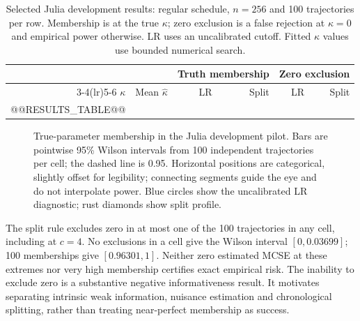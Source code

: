 \documentclass[11pt]{article}
\newcommand{\membershipplot}[1]{%
\addplot+[color=baseline,mark=*,mark size=1.5pt,error bars/.cd,y dir=both,y explicit]
 table[x expr=\thisrow{index}-0.06,y=lr,y error minus=lrminus,y error plus=lrplus]{#1};
\addplot+[color=splitcolor,mark=diamond*,mark size=1.8pt,error bars/.cd,y dir=both,y explicit]
 table[x expr=\thisrow{index}+0.06,y=split,y error minus=splitminus,y error plus=splitplus]{#1};
\addplot[gray,dashed,forget plot] coordinates {(0.65,0.95) (4.35,0.95)};
}
\begin{document}
\begin{table}[!htbp]
\centering\small
\caption{Selected Julia development results: regular schedule, $n=256$ and
100 trajectories per row. Membership is at the true $\kappa$; zero exclusion
is a false rejection at $\kappa=0$ and empirical power otherwise. LR uses an
uncalibrated cutoff. Fitted $\kappa$ values use bounded numerical search.}
\label{tab:results}
\begin{tabular}{rrrrrr}
\toprule
 & & \multicolumn{2}{c}{Truth membership} & \multicolumn{2}{c}{Zero exclusion}\\
\cmidrule(lr){3-4}\cmidrule(lr){5-6}
$\kappa$ & Mean $\widehat\kappa$ & LR & Split & LR & Split\\
\midrule
@@RESULTS_TABLE@@
\bottomrule
\end{tabular}
\end{table}

\begin{figure}[!ht]
\centering
{}
\caption{True-parameter membership in the Julia development pilot. Bars are
pointwise 95\% Wilson intervals from 100 independent trajectories per cell;
the dashed line is 0.95. Horizontal positions are categorical, slightly offset
for legibility; connecting segments guide the eye and do not interpolate power.
Blue circles show the uncalibrated LR diagnostic; rust diamonds show split profile.}
\label{fig:membership}
\end{figure}

The split rule excludes zero in at most one of the 100 trajectories in any cell,
including at $c=4$. No exclusions in a cell give the Wilson interval
$[0,0.03699]$; 100 memberships give $[0.96301,1]$. Neither zero estimated MCSE
at these extremes nor very high membership certifies exact empirical risk.
The inability to exclude zero is a substantive negative informativeness result.
It motivates separating intrinsic weak information, nuisance estimation and
chronological splitting, rather than treating near-perfect membership as success.
\end{document}
